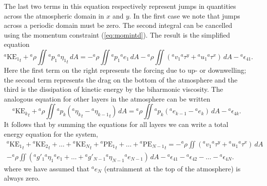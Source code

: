 \documentclass[11pt, a4paper,twoside]{article}
\newcommand{\etb}[2]{{{}^{#1}\eta_{#2}}}
\newcommand{\rhb}[1]{{{}^{#1}\rho}}
\newcommand{\gp}[2]{{}^{#1}g'_{#2}}
\newcommand{\p}[2]{{{}^{#1}p_{#2}}}
\newcommand{\uu}[2]{{{}^{#1}u_{#2}}}
\newcommand{\vv}[2]{{{}^{#1}v_{#2}}}
\newcommand{\e}[2]{{{}^{#1}e_{#2}}}
\newcommand{\tx}[2]{{}^{#1}\tau^{#2}}
\newcommand{\pe}[2]{{}^{#1}\textrm{PE}_{#2}}
\newcommand{\ke}[2]{{}^{#1}\textrm{KE}_{#2}}
\newcommand{\eps}[2]{{}^{#1}\epsilon_{#2}}
\numberwithin{equation}{section}
\begin{document}
The last two terms in this equation respectively represent jumps in quantities across the atmospheric domain in $x$ and $y$.
In the first case we note that jumps across a periodic domain must be zero.
The second integral can be cancelled using the momentum constraint (\ref{eq:momintd}).
The result is the simplified equation
\begin{equation}
 {\ke{a}{1}}_t +  \rhb{a}\iint\p{a}{1}\etb{a}{1}_t \, dA= - \rhb{a}\iint\p{a}{1} \e{a}{1} \, dA  - \rhb{a} \iint\left(\vv{a}{1}\tx{a}{y} + \uu{a}{1}\tx{a}{x}\right)\, dA - \eps{a}{41}.
\end{equation}
Here the first term on the right represents the forcing due to up- or downwelling; the second term represents the drag on the bottom of the atmosphere and the third is the dissipation of kinetic energy by the biharmonic viscosity.
The analogous equation for other layers in the atmosphere can be written
\begin{equation}
 {\ke{a}{k}}_t + \rhb{a}\iint\p{a}{k}\left(\etb{a}{k}_t - \etb{a}{k-1}_t\right) \, dA =  \rhb{a}\iint\p{a}{k}(\e{a}{k-1} - \e{a}{k}) \, dA  - \eps{a}{4k}.
\end{equation}
It follows that by summing the equations for all layers we can write a total energy equation for the system,
\begin{multline}
 {\ke{a}{1}}_t +{\ke{a}{2}}_t+ \ldots +{\ke{a}{N}}_t + {\pe{a}{1}}_t + \ldots +{\pe{a}{N-1}}_t = - \rhb{a} \iint\left(\vv{a}{1}\tx{a}{y} + \uu{a}{1}\tx{a}{x}\right)\, dA \\
- \rhb{a}\iint\left( \gp{a}{1}\etb{a}{1} \e{a}{1} + \ldots + \gp{a}{N-1}\etb{a}{N-1} \e{a}{N-1} \right) \, dA - \eps{a}{41}- \eps{a}{42} - \ldots - \eps{a}{4N}.
\end{multline}
where we have assumed that $\e{a}{N}$ (entrainment at the top of the atmosphere) is always zero.
\end{document}
